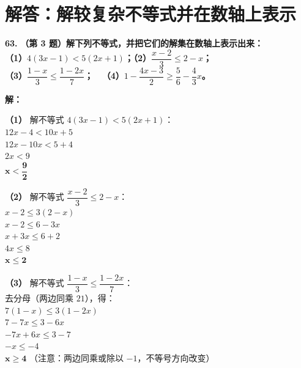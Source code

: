 \documentclass[12pt, a4paper]{ctexrep}
\begin{document}
\newpage

\section{解答：解较复杂不等式并在数轴上表示}

\vspace{0.6cm}

\textbf{\LARGE 63.} \textbf{（第 3 题）解下列不等式，并把它们的解集在数轴上表示出来：\\
（1）$4(3x-1) < 5(2x+1)$；\qquad\quad （2）$\dfrac{x-2}{3} \leqslant 2-x$；\\[1.5ex]
（3）$\dfrac{1-x}{3} \leqslant \dfrac{1-2x}{7}$；\qquad\qquad\,\,\,\, （4）$1 - \dfrac{4x-3}{2} \geqslant \dfrac{5}{6} - \dfrac{4}{3}x$。}

\vspace{0.4cm}
\textbf{解：}

\textbf{（1）} 解不等式 $4(3x-1) < 5(2x+1)$：\\
\hspace*{0.8cm} $12x - 4 < 10x + 5$\\
\hspace*{0.8cm} $12x - 10x < 5 + 4$\\
\hspace*{0.8cm} $2x < 9$\\
\hspace*{0.8cm} $\boldsymbol{x < \dfrac{9}{2}}$

\textbf{（2）} 解不等式 $\dfrac{x-2}{3} \leqslant 2-x$：\\
\hspace*{0.8cm} $x - 2 \leqslant 3(2 - x)$\\
\hspace*{0.8cm} $x - 2 \leqslant 6 - 3x$\\
\hspace*{0.8cm} $x + 3x \leqslant 6 + 2$\\
\hspace*{0.8cm} $4x \leqslant 8$\\
\hspace*{0.8cm} $\boldsymbol{x \leqslant 2}$

\textbf{（3）} 解不等式 $\dfrac{1-x}{3} \leqslant \dfrac{1-2x}{7}$：\\
\hspace*{0.8cm} 去分母（两边同乘 $21$），得：\\
\hspace*{0.8cm} $7(1 - x) \leqslant 3(1 - 2x)$\\
\hspace*{0.8cm} $7 - 7x \leqslant 3 - 6x$\\
\hspace*{0.8cm} $-7x + 6x \leqslant 3 - 7$\\
\hspace*{0.8cm} $-x \leqslant -4$\\
\hspace*{0.8cm} $\boldsymbol{x \geqslant 4}$ （注意：两边同乘或除以 $-1$，不等号方向改变）
\end{document}
